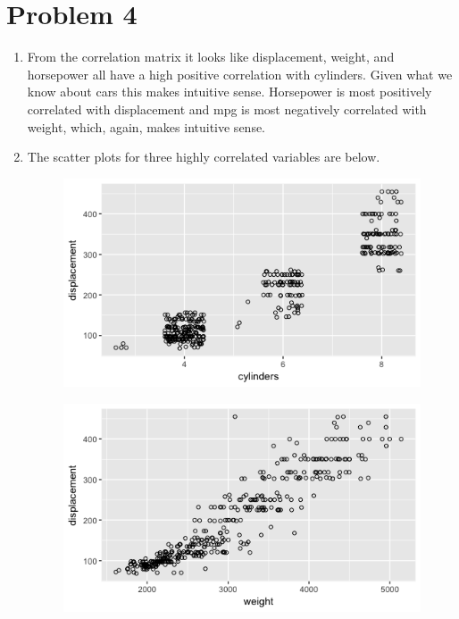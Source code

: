 \section*{Problem 4}

\begin{enumerate}
	\item From the correlation matrix it looks like displacement, weight, and horsepower all have a high positive correlation with cylinders. Given what we know about cars this makes intuitive sense. Horsepower is most positively correlated with displacement and mpg is most negatively correlated with weight, which, again, makes intuitive sense. 
	\item The scatter plots for three highly correlated variables are below. 
	\newline
	\begin{figure}[htbp]
		\centering
		\includegraphics{img/ESL_02_disp_vs_cyl.png}
	\end{figure}
	\begin{figure}[htbp]
		\centering
		\includegraphics{img/ESL_02_disp_vs_weight.png}

\end{figure}
\end{enumerate}
